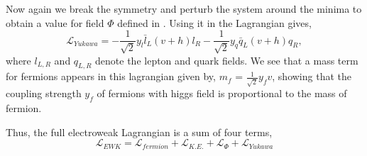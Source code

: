 Now again we break the symmetry and perturb the system around the minima to obtain a value for field $\Phi$ defined in \eqn{\ref{eq:Higgs_phi_final}}. Using it in the
Lagrangian gives,
\begin{equation}
  \mathcal{L}_{Yukawa} = -\frac{1}{\sqrt{2}}y_{l}\bar{l}_{L}(v+h)l_{R} -\frac{1}{\sqrt{2}}y_{q}\bar{q}_{L}(v+h)q_{R},
\end{equation}
where $l_{L,R}$ and $q_{L,R}$ denote the lepton and quark fields. We see that a mass term for fermions appears in this lagrangian given by, $m_{f}$ = $\frac{1}{\sqrt{2}}y_{f}v$, showing that the coupling strength $y_{f}$ of fermions with higgs field is
proportional to the mass of fermion. 

Thus, the full electroweak Lagrangian is a sum of four terms,
\begin{equation}
  \mathcal{L}_{EWK} = \mathcal{L}_{fermion} + \mathcal{L}_{K.E.} + \mathcal{L}_{\Phi} + \mathcal{L}_{Yukawa}
\end{equation}
 
